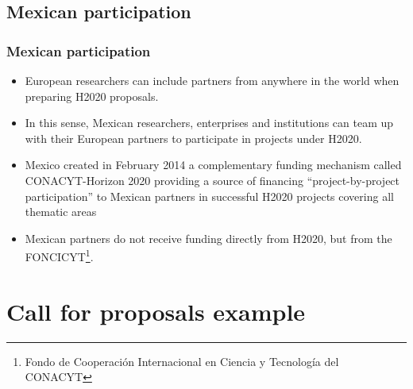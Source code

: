 \documentclass[compress,9pt,xcolor={dvipsnames,table}]{beamer}
\begin{document}
\subsection{Mexican participation}
\begin{frame}\frametitle{Mexican participation}
\begin{itemize}
  \item European researchers can include partners from anywhere in the world when preparing H2020 proposals.
  \item In this sense, Mexican researchers, enterprises and institutions can team up with their European partners to participate in projects under H2020.
  \item Mexico created in February 2014 a complementary funding mechanism called CONACYT-Horizon 2020 providing a source of financing ``project-by-project participation'' to Mexican partners in successful H2020 projects covering all thematic areas
  \item Mexican partners do not receive funding directly from H2020, but from the FONCICYT\footnote{Fondo de Cooperación Internacional en Ciencia y Tecnología del CONACYT}.
\end{itemize}
\end{frame}

\section{Call for proposals example}
\end{document}
